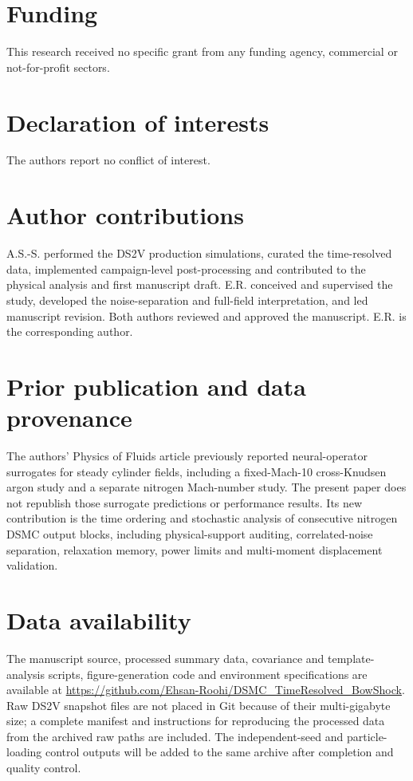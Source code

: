 \section*{Funding}
This research received no specific grant from any funding agency, commercial or not-for-profit sectors.

\section*{Declaration of interests}
The authors report no conflict of interest.

\section*{Author contributions}
A.S.-S. performed the DS2V production simulations, curated the time-resolved data, implemented campaign-level post-processing and contributed to the physical analysis and first manuscript draft. E.R. conceived and supervised the study, developed the noise-separation and full-field interpretation, and led manuscript revision. Both authors reviewed and approved the manuscript. E.R. is the corresponding author.

\section*{Prior publication and data provenance}
The authors' Physics of Fluids article \citep{RoohiShojaAzghadi2026PoF} previously reported neural-operator surrogates for steady cylinder fields, including a fixed-Mach-10 cross-Knudsen argon study and a separate nitrogen Mach-number study. The present paper does not republish those surrogate predictions or performance results. Its new contribution is the time ordering and stochastic analysis of consecutive nitrogen DSMC output blocks, including physical-support auditing, correlated-noise separation, relaxation memory, power limits and multi-moment displacement validation.

\section*{Data availability}
The manuscript source, processed summary data, covariance and template-analysis scripts, figure-generation code and environment specifications are available at \url{https://github.com/Ehsan-Roohi/DSMC_TimeResolved_BowShock}. Raw DS2V snapshot files are not placed in Git because of their multi-gigabyte size; a complete manifest and instructions for reproducing the processed data from the archived raw paths are included. The independent-seed and particle-loading control outputs will be added to the same archive after completion and quality control.
